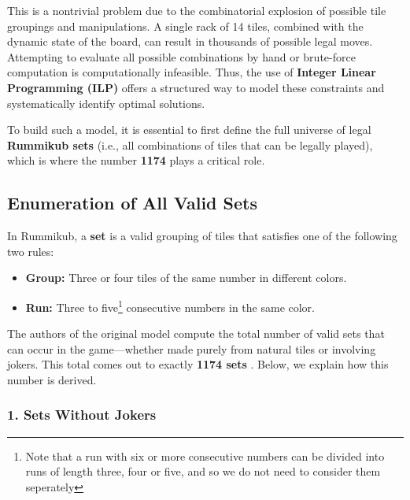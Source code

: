 \documentclass[11pt,letterpaper]{article}
\begin{document}
This is a nontrivial problem due to the combinatorial explosion of possible tile groupings and manipulations. A single rack of 14 tiles, combined with the dynamic state of the board, can result in thousands of possible legal moves. Attempting to evaluate all possible combinations by hand or brute-force computation is computationally infeasible. Thus, the use of \textbf{Integer Linear Programming (ILP)} offers a structured way to model these constraints and systematically identify optimal solutions.

To build such a model, it is essential to first define the full universe of legal \textbf{Rummikub sets} (i.e., all combinations of tiles that can be legally played), which is where the number \textbf{1174} plays a critical role.

\subsection*{Enumeration of All Valid Sets}

In Rummikub, a \textbf{set} is a valid grouping of tiles that satisfies one of the following two rules:
\begin{itemize}
    \item \textbf{Group:} Three or four tiles of the same number in different colors.
    \item \textbf{Run:} Three to five\footnote{Note that a run with six or more 
    consecutive numbers can be divided into runs of length three, four or five, and
     so we do not need to consider them seperately} consecutive numbers in the same color.
\end{itemize}

The authors of the original model compute the total number of valid sets that can occur in the game---whether made purely from natural tiles or involving jokers. This total comes out to exactly \textbf{1174 sets} \cite{den2006solving}. Below, we explain how this number is derived.

\subsubsection*{1. Sets Without Jokers}
\end{document}
